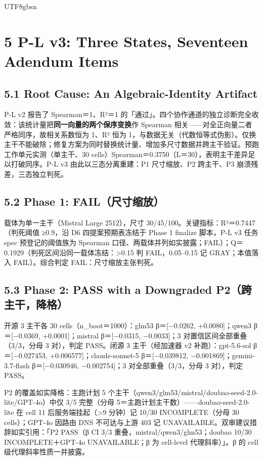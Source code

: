 \documentclass[10pt,a4paper]{article}
\begin{document}
\begin{CJK}{UTF8}{gbsn}
\section*{5 P-L v3: Three States, Seventeen Adendum Items}\subsection*{5.1 Root Cause: An Algebraic-Identity Artifact}P-L v2 报告了 Spearman＝1、R²＝1 的「通过」。四个协作通道的独立诊断完全收敛：该统计量把\textbf{同一向量的两个保序变换}作 Spearman 相关——对全正向量二者严格同序，故相关系数恒为 1、R² 恒为 1，与数据无关（代数恒等式伪影）。仅换主干不能破除；修复方案为同时替换统计量、增加多尺寸数据并跨主干验证。预跑工作单元实测（单主干、30 cells）Spearman＝0.3750（L＝30），表明主干差异足以打破同序。P-L v3 由此以三态分离重建：P1 尺寸缩放、P2 跨主干、P3 崩溃残差，三态独立判死。

\subsection*{5.2 Phase 1: FAIL（尺寸缩放）}载体为单一主干（Mistral Large 2512），尺寸 30/45/100。关键指标：R²＝0.7447（判死阈值 ≥0.9，沿 D6 四提案预期表冻结于 Phase 1 finalize 脚本，P-L v3 任务 spec 预登记的阈值族为 Spearman 口径、两载体并列如实披露；FAIL）；Q＝0.1929（判死区间沿同一载体冻结：>0.15 判 FAIL，0.05–0.15 记 GRAY；本值落入 FAIL）。综合判定 FAIL：尺寸缩放主张判死。

\subsection*{5.3 Phase 2: PASS with a Downgraded P2（跨主干，降格）}开源 3 主干各 30 cells（n\_boot＝1000）：glm53 β＝[−0.0262, +0.0080]；qwen3 β＝[−0.0369, +0.0001]；mistral β＝[−0.0315, −0.0033]；3 对置信区间全部重叠（3/3，分母 3 对），判定 PASS。闭源 3 主干（经加速器 v2 补跑）：gpt-5.6-sol β＝[−0.027453, +0.006577]；claude-sonnet-5 β＝[−0.039812, −0.001869]；gemini-3.7-flash β＝[−0.030946, −0.002754]；3 对全部重叠（3/3，分母 3 对），判定 PASS。

P2 的覆盖如实降格：主跑计划 5 个主干（qwen3/glm53/mistral/doubao-seed-2.0-lite/GPT-4o）中仅 3/5 完整（分母 5＝主跑计划主干数）——doubao-seed-2.0-lite 在 cell 11 后服务端挂起（>9 分钟）记 10/30 INCOMPLETE（分母 30 cells）；GPT-4o 因路由 DNS 不可达与上游 403 记 UNAVAILABLE。双审建议措辞如实引用：「P2 PASS（β CI 3/3 重叠，mistral/qwen3/glm53；doubao 10/30 INCOMPLETE＋GPT-4o UNAVAILABLE；β 为 cell-level 代理斜率）」。β 的 cell 级代理斜率性质一并披露。


\end{CJK}
\end{document}
